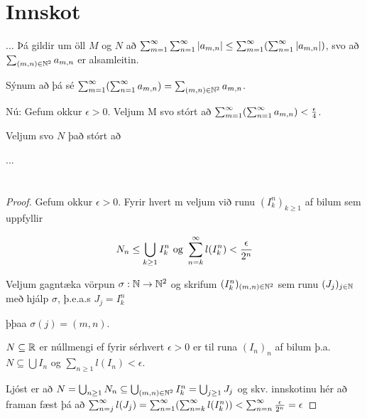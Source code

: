 \documentclass[12pt]{book}
\begin{document}
\section*{Innskot}

{

\def\mn{(m,n)}
\def\amn{a_{m,n}}
\def\summn{\sum_{\mn \in \N^2}}

... %
Þá gildir um öll $M$ og $N$ að $\sum_{m=1}^{\infty} \sum_{n=1}^{\infty} \abs{\amn} \leq \summinfty (\sumoinfty \abs{\amn})$, svo að $\sum_{\mn \in \N^2} \amn$ er alsamleitin.

Sýnum að þá sé $\summinfty ( \sumoinfty \amn ) = \summn \amn$.

Nú: Gefum okkur $\epsilon > 0$. Veljum M svo stórt að $\summinfty ( \sumoinfty \amn ) < \eps{4}$.

Veljum svo $N$ það stórt að

... %


}

\section{}

\subsection{}
\begin{proof}

Gefum okkur $\epsilon > 0$. Fyrir hvert m veljum við runu $(I^n_k)_{k \geq 1}$ af bilum sem uppfyllir

\[N_n \leq \bigcup_{k \geq 1} I_k^n \text{ og } \sum_{n = {k}}^{\infty} l(I^n_k) < \frac{\epsilon}{2^n}\]

Veljum gagntæka vörpun $\sigma: \mathbb{N} \to \mathbb{N}^2$ og skrifum $(I^n_k)_{(m,n) \in \mathbb{N}^2}$ sem runu
$(J_j)_{j \in \mathbb{N}}$ með hjálp $\sigma$, þ.e.a.s $J_j = I^n_k$

þþaa $\sigma (j) = (m,n)$.

\begin{ath}
$N \subseteq \mathbb{R}$ er núllmengi ef fyrir sérhvert $\epsilon > 0$ er til runa $(I_n)_{n}$ af bilum þ.a.
$N \subseteq \bigcup I_n$ og $\sum_{n \geq 1} l(I_n) < \epsilon$.

\end{ath}

Ljóst er að $N = \bigcup_{n \geq 1} N_n \subseteq \bigcup_{(m,n) \in \mathbb{N}^2} I^n_k = \bigcup_{j \geq 1} J_j$
og skv. innskotinu hér að framan fæst þá að
$\sum_{n = {j}}^{\infty} l(J_j) = \sum_{n = 1}^{\infty} ( \sum_{n = {k}}^{\infty} l(I_k^n)) < \sum_{n = {n}}^{\infty} \frac{\epsilon}{2^n} = \epsilon$

\end{proof}
\end{document}
